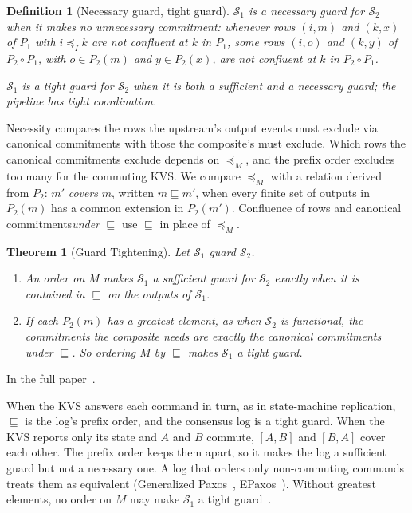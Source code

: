 \documentclass[sigconf]{cidr-2027}
\makeatletter
\newtheorem{theorem}{Theorem}
\newtheorem{definition}{Definition}
\theoremstyle{remark}
\newcommand{\InputOrd}{\preceq_I}
\newcommand{\commitment}{commitment\xspace}
\newcommand{\commitments}{commitments\xspace}
\newcommand{\Spec}{\mathcal{S}}
\newcommand{\proofinfull}{\par\pushQED{\qed}\normalfont\topsep2\p@\relax
  \trivlist\item[\@proofindent\hskip\labelsep{\@proofnamefont\proofname\@addpunct{.}}]%
  \ignorespaces In the full paper~\cite{hellerstein2026completecalmfull}.%
  \popQED\endtrivlist\@endpefalse}
\makeatother
\begin{document}
\begin{definition}[Necessary guard, tight guard]
\label{def:necessary-guard}
\label{def:tight-guard}
$\Spec_1$ is a \emph{necessary guard} for $\Spec_2$ when it makes no
unnecessary \commitment: whenever rows $(i,m)$ and $(k,x)$
of $P_1$ with $i\InputOrd k$ are not confluent at $k$ in $P_1$, some rows
$(i,o)$ and $(k,y)$ of $P_2\circ P_1$, with $o\in P_2(m)$ and $y\in P_2(x)$,
are not confluent at $k$ in $P_2\circ P_1$.

$\Spec_1$ is a \emph{tight guard} for $\Spec_2$ when it is both a
sufficient and a necessary guard; the pipeline has \emph{tight} coordination.
\end{definition}

Necessity compares the rows the upstream's output events must exclude via
canonical \commitments with those the composite's must exclude.  Which rows the
canonical \commitments exclude depends on $\preceq_M$, and the prefix order
excludes too many for the commuting KVS.  We compare
$\preceq_M$ with a relation derived from $P_2$: $m'$ \emph{covers} $m$,
written $m\sqsubseteq m'$, when every finite set of outputs in $P_2(m)$ has a
common extension in $P_2(m')$.  Confluence of rows and canonical
\commitments \emph{under} $\sqsubseteq$ use $\sqsubseteq$ in place of
$\preceq_M$.

\begin{theorem}[Guard Tightening]
\label{thm:guard-tightening}
Let $\Spec_1$ guard $\Spec_2$.
\begin{enumerate}
    \item An order on $M$ makes $\Spec_1$ a sufficient guard for $\Spec_2$
        exactly when it is contained in $\sqsubseteq$ on the outputs of
        $\Spec_1$.
  \item If each $P_2(m)$ has a greatest element, as when $\Spec_2$ is
        functional, the \commitments the composite needs are exactly the
        canonical \commitments under $\sqsubseteq$.  So ordering $M$ by
        $\sqsubseteq$ makes $\Spec_1$ a tight guard.
\end{enumerate}
\end{theorem}
\proofinfull

When the KVS answers each command in turn, as in state-machine replication,
$\sqsubseteq$ is the log's prefix order, and the consensus log is a tight guard.
When the KVS reports only its state and $A$ and $B$ commute, $[A,B]$ and
$[B,A]$ cover each other.  The prefix order keeps them apart, so it makes the
log a sufficient guard but not a necessary one.  A log that orders only
non-commuting commands treats them as equivalent (Generalized
Paxos~\cite{lamport2005generalized}, EPaxos~\cite{moraru2013epaxos}).  Without greatest elements, no order on $M$
may make $\Spec_1$ a tight guard~\cite{hellerstein2026completecalmfull}.
\end{document}
